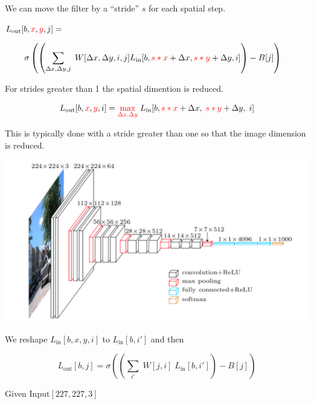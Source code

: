{

We can move the filter by a ``stride'' $s$ for each spatial step.

\vfill
$L_{\mathrm{out}}[b,{\color{red}x},{\color{red}y},j] =$

$$\hspace{-1em}\sigma\left(\left(\sum_{\Delta x,\Delta y,j}\;W[\Delta x, \Delta y, i, j] L_{\mathrm{in}}[b,{\color{red} s*x} + \Delta x, {\color{red} s*y} + \Delta y, i]\right) - B[j]\right)$$

\vfill
For strides greater than 1 the spatial dimention is reduced.


$$L_{\mathrm{out}}[b,{\color{red}x},{\color{red}y},i] = {\color{red} \max_{\Delta x, \Delta y}}\; L_{\mathrm{in}}[b,{\color{red} s*x} + \Delta x,\; {\color{red} s*y} + \Delta y,\; i]$$

\vfill
This is typically done with a stride greater than one so that the image dimension is reduced.



\centerline{\includegraphics[width = 8.0in]{../images/VGG}}



We reshape $L_{\mathrm{in}}[b,x,y,i]$ to $L_{\mathrm{in}}[b,i']$ and then

\vfill
$$L_{\mathrm{out}}[b,j] = \sigma\left(\left(\sum_{i'} \;W[j,i]\;L_{\mathrm{in}}[b,i']\right) - B[j]\right)$$

{\huge
\centerline{Given Input$[227,227,3]$}

}}
